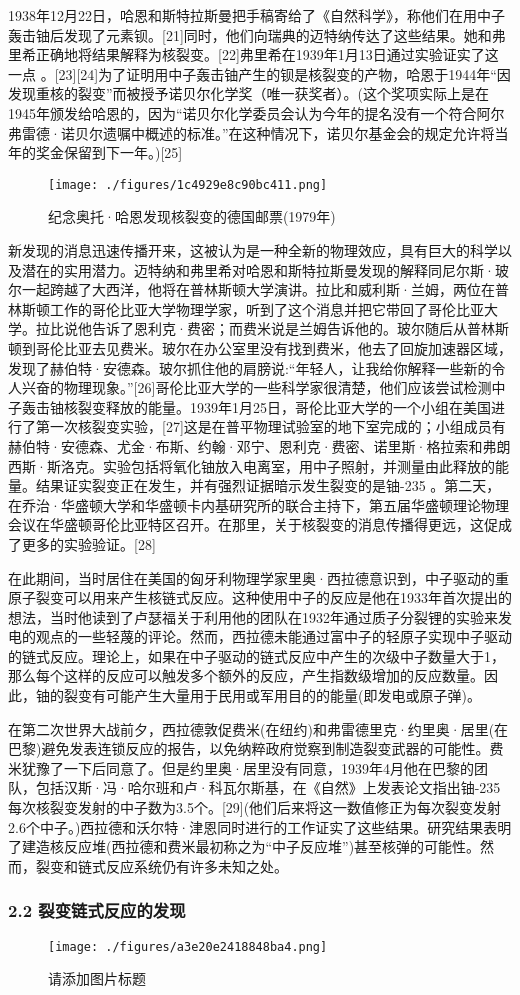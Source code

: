1938年12月22日，哈恩和斯特拉斯曼把手稿寄给了《自然科学》，称他们在用中子轰击铀后发现了元素钡。[21]同时，他们向瑞典的迈特纳传达了这些结果。她和弗里希正确地将结果解释为核裂变。[22]弗里希在1939年1月13日通过实验证实了这一点 。[23][24]为了证明用中子轰击铀产生的钡是核裂变的产物，哈恩于1944年“因发现重核的裂变”而被授予诺贝尔化学奖（唯一获奖者）。(这个奖项实际上是在1945年颁发给哈恩的，因为“诺贝尔化学委员会认为今年的提名没有一个符合阿尔弗雷德·诺贝尔遗嘱中概述的标准。”在这种情况下，诺贝尔基金会的规定允许将当年的奖金保留到下一年。)[25]
\begin{figure}[ht]
\centering
\texttt{[image: ./figures/1c4929e8c90bc411.png]}
\caption{纪念奥托·哈恩发现核裂变的德国邮票(1979年)} \label{fig_HLB_10}
\end{figure}
新发现的消息迅速传播开来，这被认为是一种全新的物理效应，具有巨大的科学以及潜在的实用潜力。迈特纳和弗里希对哈恩和斯特拉斯曼发现的解释同尼尔斯·玻尔一起跨越了大西洋，他将在普林斯顿大学演讲。拉比和威利斯·兰姆，两位在普林斯顿工作的哥伦比亚大学物理学家，听到了这个消息并把它带回了哥伦比亚大学。拉比说他告诉了恩利克·费密；而费米说是兰姆告诉他的。玻尔随后从普林斯顿到哥伦比亚去见费米。玻尔在办公室里没有找到费米，他去了回旋加速器区域，发现了赫伯特·安德森。玻尔抓住他的肩膀说:“年轻人，让我给你解释一些新的令人兴奋的物理现象。”[26]哥伦比亚大学的一些科学家很清楚，他们应该尝试检测中子轰击铀核裂变释放的能量。1939年1月25日，哥伦比亚大学的一个小组在美国进行了第一次核裂变实验，[27]这是在普平物理试验室的地下室完成的；小组成员有赫伯特·安德森、尤金·布斯、约翰·邓宁、恩利克·费密、诺里斯·格拉索和弗朗西斯·斯洛克。实验包括将氧化铀放入电离室，用中子照射，并测量由此释放的能量。结果证实裂变正在发生，并有强烈证据暗示发生裂变的是铀-235 。第二天，在乔治·华盛顿大学和华盛顿卡内基研究所的联合主持下，第五届华盛顿理论物理会议在华盛顿哥伦比亚特区召开。在那里，关于核裂变的消息传播得更远，这促成了更多的实验验证。[28]

在此期间，当时居住在美国的匈牙利物理学家里奥·西拉德意识到，中子驱动的重原子裂变可以用来产生核链式反应。这种使用中子的反应是他在1933年首次提出的想法，当时他读到了卢瑟福关于利用他的团队在1932年通过质子分裂锂的实验来发电的观点的一些轻蔑的评论。然而，西拉德未能通过富中子的轻原子实现中子驱动的链式反应。理论上，如果在中子驱动的链式反应中产生的次级中子数量大于1，那么每个这样的反应可以触发多个额外的反应，产生指数级增加的反应数量。因此，铀的裂变有可能产生大量用于民用或军用目的的能量(即发电或原子弹)。

在第二次世界大战前夕，西拉德敦促费米(在纽约)和弗雷德里克·约里奥·居里(在巴黎)避免发表连锁反应的报告，以免纳粹政府觉察到制造裂变武器的可能性。费米犹豫了一下后同意了。但是约里奥·居里没有同意，1939年4月他在巴黎的团队，包括汉斯·冯·哈尔班和卢·科瓦尔斯基，在《自然》上发表论文指出铀-235每次核裂变发射的中子数为3.5个。[29](他们后来将这一数值修正为每次裂变发射2.6个中子。)西拉德和沃尔特·津恩同时进行的工作证实了这些结果。研究结果表明了建造核反应堆(西拉德和费米最初称之为“中子反应堆”)甚至核弹的可能性。然而，裂变和链式反应系统仍有许多未知之处。

\subsubsection{2.2 裂变链式反应的发现}
\begin{figure}[ht]
\centering
\texttt{[image: ./figures/a3e20e2418848ba4.png]}
\caption{请添加图片标题} \label{fig_HLB_11}
\end{figure}
